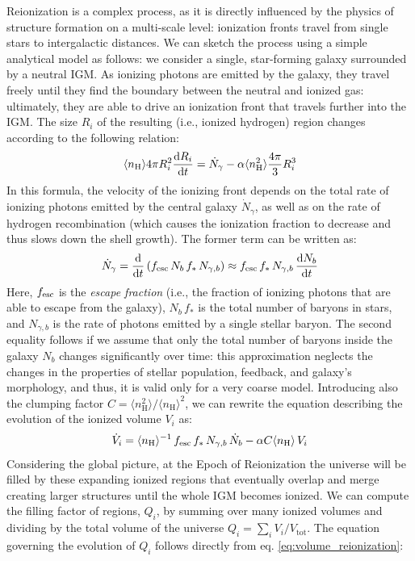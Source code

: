  Reionization is a complex process, as it is directly influenced by the physics of structure formation on a multi-scale level: ionization fronts travel from single stars to intergalactic distances. We can sketch the process using a simple analytical model as follows: we consider a single, star-forming galaxy surrounded by a neutral IGM. As ionizing photons are emitted by the galaxy, they travel freely until they find the boundary between the neutral and ionized gas: ultimately, they are able to drive an ionization front that travels further into the IGM. The size $R_i$ of the resulting \HII (i.e., ionized hydrogen) region changes according to the following relation:
 \begin{align}
   \langle n_\mathrm{H}\rangle 4\pi R_i^2 \frac{\mathrm{d} R_i}{\mathrm{d} t} = \dot{N}_\gamma- \alpha \langle n_\mathrm{H}^2\rangle \frac{4\pi}{3} R_i^3
  \end{align}
  In this formula, the velocity of the ionizing front depends on the total rate of ionizing photons emitted by the central galaxy $\dot{N}_\gamma$, as well as on the rate of hydrogen recombination (which causes the ionization fraction to decrease and thus slows down the shell growth). The former term can be written as:
  \begin{align}
  \dot{N}_\gamma = \frac{\mathrm{d}}{\mathrm{d} t}\left(f_{\rm esc}\, N_b\, f_*\, N_{\gamma,b}\right) \approx  f_{\rm esc} \, f_*\, N_{\gamma,b}\,\frac{\mathrm{d} N_b}{\mathrm{d} t}
  \end{align}
  Here, $f_{\rm esc}$ is the \textit{escape fraction} (i.e., the fraction of ionizing photons that are able to escape from the galaxy), $N_b \,f_*$ is the total number of baryons in stars, and $N_{\gamma,b}$ is the rate of photons emitted by a single stellar baryon. The second equality follows if we assume that only the total number of baryons inside the galaxy $N_b$ changes significantly over time: this approximation neglects the changes in the properties of stellar population, feedback, and galaxy's morphology, and thus, it is valid only for a very coarse model. Introducing also the clumping factor $C= \langle n_\mathrm{H}^2\rangle/  \langle n_\mathrm{H}\rangle^2  $, we can rewrite the equation describing the evolution of the ionized volume $V_i$ as:
  \begin{align}
   \dot{V}_i = \langle n_\mathrm{H}\rangle^{-1} \,f_{\rm esc} \, f_*\, N_{\gamma,b}\,\dot{N}_b - \alpha C \langle n_\mathrm{H}\rangle\,V_i \label{eq:volume_reionization}
  \end{align}
  Considering the global picture, at the Epoch of Reionization the universe will be filled by these expanding ionized regions that eventually overlap and merge creating larger \HII structures until the whole IGM becomes ionized. We can compute the filling factor of \HII regions, $Q_i$, by summing over many ionized volumes and dividing by the total volume of the universe $Q_i = \sum_i V_i / V_\mathrm{tot}$. The equation governing the evolution of $Q_i$ follows directly from eq. \ref{eq:volume_reionization}:
